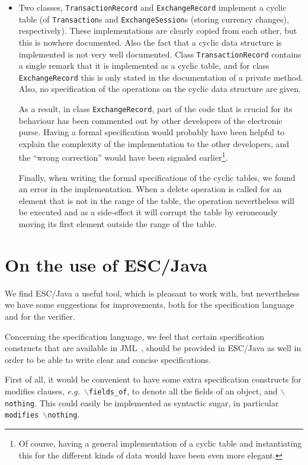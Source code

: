 \documentclass[a4paper]{llncs}
\newcommand{\noth}{\(\backslash\)\texttt{nothing}}
\newcommand{\fieldsof}{\(\backslash\)\texttt{fields\_of}}
\begin{document}
\begin{itemize}
\item Two classes, \texttt{TransactionRecord} and
\texttt{ExchangeRecord} implement a cyclic table (of
\texttt{Transaction}s and
\texttt{ExchangeSession}s (storing currency changes),
respectively).  These implementations are clearly copied from each
other, but this is nowhere documented. Also the fact that a
cyclic data structure is implemented is not very well documented. Class
\texttt{TransactionRecord} contains a single remark that it is
implemented as a cyclic table, and for class
\texttt{ExchangeRecord} this is only stated in the documentation of a
private method. Also, no specification of the operations on the cyclic
data structure are given.

As a result, in class \texttt{ExchangeRecord}, part of the code that
is crucial for its behaviour has been commented out by other
developers of the electronic purse. Having a formal specification
would probably have been helpful to explain the complexity of the
implementation to the other developers, and the ``wrong correction''
would have been signaled earlier\footnote{Of course, having a general 
implementation of a cyclic table and instantiating this for the
different kinds of data would have been even more elegant.}.

Finally, when writing the formal specifications of the cyclic tables,
we found an error in the implementation. When a delete operation is
called for an element that is not in the range of the table, the
operation nevertheless will be executed and as a side-effect it will
corrupt the table by erroneously moving its first element outside the
range of the table.
\end{itemize}

\section{On the use of ESC/Java}
\label{SectESC}
We find ESC/Java a useful tool, which is pleasant to work with, but
nevertheless we have some suggestions for improvements, both for the
specification language and for the verifier.

Concerning the specification language, we feel that certain
specification constructs that are available in JML~\cite{LeavensBR99},
should be provided in ESC/Java as well in order to be able to write
clear and concise specifications. 

First of all, it would be convenient to have some extra specification
constructs for modifies clauses, \emph{e.g.}~\fieldsof, to denote all
the fields of an object, and \noth. This could easily be implemented
as syntactic sugar, in particular \texttt{modifies \noth}.
\end{document}
